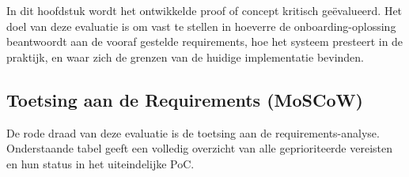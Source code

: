 \chapter{}%
\label{ch:evaluatie}

In dit hoofdstuk wordt het ontwikkelde proof of concept kritisch geëvalueerd. Het doel van deze evaluatie is om vast te stellen in hoeverre de onboarding-oplossing beantwoordt aan de vooraf gestelde requirements, hoe het systeem presteert in de praktijk, en waar zich de grenzen van de huidige implementatie bevinden.

\section{Toetsing aan de Requirements (MoSCoW)}
De rode draad van deze evaluatie is de toetsing aan de requirements-analyse. Onderstaande tabel geeft een volledig overzicht van alle geprioriteerde vereisten en hun status in het uiteindelijke PoC.

